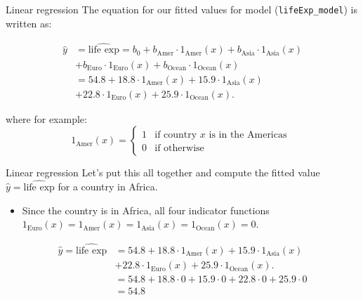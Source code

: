\documentclass[
  ignorenonframetext,
]{beamer}
\providecommand{\tightlist}{%
  \setlength{\itemsep}{0pt}\setlength{\parskip}{0pt}}
\begin{document}
\begin{frame}[fragile]{Linear regression}
\protect\hypertarget{linear-regression-3}{}
The equation for our fitted values for model (\texttt{lifeExp\_model})
is written as:

\[\begin{array}{ll}
\hat{y}&=\widehat{\text{life exp}}=b_0+b_{\text{Amer}}\cdot1_{\text{Amer}}(x)+b_{\text{Asia}}\cdot1_{\text{Asia}}(x)\\
&+b_{\text{Euro}}\cdot1_{\text{Euro}}(x)+b_{\text{Ocean}}\cdot1_{\text{Ocean}}(x)\\
&=54.8+18.8\cdot1_{\text{Amer}}(x)+15.9\cdot 1_{\text{Asia}}(x)\\
&+22.8\cdot 1_{\text{Euro}}(x)+25.9\cdot 1_{\text{Ocean}}(x).
\end{array}\]

where for example:
\[1_{\text{Amer}}(x)=\left\{\begin{array}{ll} 1 & \text{if country } x \text{ is in the Americas }\\
0 & \text{if otherwise} \end{array}\right.\]
\end{frame}

\begin{frame}{Linear regression}
\protect\hypertarget{linear-regression-4}{}
Let's put this all together and compute the fitted value
\(\hat{y}=\widehat{\text{life exp}}\) for a country in Africa.

\begin{itemize}
\tightlist
\item
  Since the country is in Africa, all four indicator functions
  \(1_{\text{Euro}}(x)=1_{\text{Amer}}(x)=1_{\text{Asia}}(x)=1_{\text{Ocean}}(x)=0\).
\end{itemize}

\[\begin{array}{ll}
\hat{y}=\widehat{\text{life exp}}&=54.8+18.8\cdot1_{\text{Amer}}(x)+15.9\cdot 1_{\text{Asia}}(x)\\
&+22.8\cdot 1_{\text{Euro}}(x)+25.9\cdot 1_{\text{Ocean}}(x).\\
&=54.8+18.8\cdot0+15.9\cdot 0+22.8\cdot 0+25.9\cdot 0\\
&=54.8
\end{array}\]
\end{frame}
\end{document}
